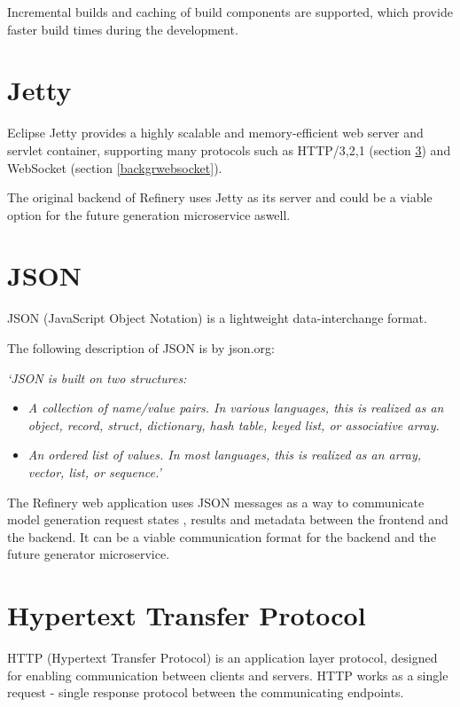 	Incremental builds and caching of build components are supported, which provide faster build times during the development.

\section{Jetty} \label{backgrjetty}
	Eclipse Jetty \cite{jetty} provides a highly scalable and memory-efficient web server and servlet container, supporting many protocols
	such as HTTP/3,2,1 (section \ref{backgrhttp}) and WebSocket (section \ref{backgrwebsocket}). 
	 
	The original backend of Refinery uses Jetty as its server and could be a viable option for the future generation
	microservice aswell.

\section{JSON} \label{backgrjson}
	JSON (JavaScript Object Notation) \cite{json} is a lightweight data-interchange format. 

	The following description of JSON is by json.org:

	\textit{`JSON is built on two structures:}
	\begin{itemize}
		\item \textit{A collection of name/value pairs. In various languages, this is realized as an object, record, struct, dictionary, hash table, 
		keyed list, or associative array.}
		\item \textit{An ordered list of values. In most languages, this is realized as an array, vector, list, or sequence.'}
	\end{itemize}

	The Refinery web application uses JSON messages as a way to communicate model generation request states
	, results and metadata between the frontend and the backend. It can be a viable communication format for the backend and the 
	future generator microservice.

\section{Hypertext Transfer Protocol} \label{backgrhttp}
	HTTP (Hypertext Transfer Protocol) \cite{httpdoc} is an application layer protocol, 
	designed for enabling communication between clients and servers. 
	HTTP works as a single request - single response protocol between the communicating endpoints.


